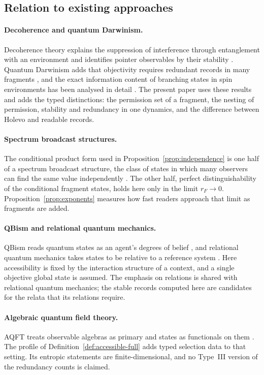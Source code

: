 \documentclass[12pt,a4paper]{article}
\begin{document}
\subsection{Relation to existing approaches}
\label{sec:relations}

\paragraph{Decoherence and quantum Darwinism.} Decoherence theory explains the suppression of interference through entanglement with an environment and identifies pointer observables by their stability \cite{Zurek2003}. Quantum Darwinism adds that objectivity requires redundant records in many fragments \cite{Zurek2009}, and the exact information content of branching states in spin environments has been analysed in detail \cite{ZwolakRiedelZurek2016}. The present paper uses these results and adds the typed distinctions: the permission set of a fragment, the nesting of permission, stability and redundancy in one dynamics, and the difference between Holevo and readable records.

\paragraph{Spectrum broadcast structures.} The conditional product form used in Proposition~\ref{prop:independence} is one half of a spectrum broadcast structure, the class of states in which many observers can find the same value independently \cite{HorodeckiKorbiczHorodecki2015}. The other half, perfect distinguishability of the conditional fragment states, holds here only in the limit $r_F\to0$. Proposition~\ref{prop:exponents} measures how fast readers approach that limit as fragments are added.

\paragraph{QBism and relational quantum mechanics.} QBism reads quantum states as an agent's degrees of belief \cite{Fuchs2014}, and relational quantum mechanics takes states to be relative to a reference system \cite{Rovelli1996}. Here accessibility is fixed by the interaction structure of a context, and a single objective global state is assumed. The emphasis on relations is shared with relational quantum mechanics; the stable records computed here are candidates for the relata that its relations require.

\paragraph{Algebraic quantum field theory.} AQFT treats observable algebras as primary and states as functionals on them \cite{Haag1996}. The profile of Definition~\ref{def:accessible-full} adds typed selection data to that setting. Its entropic statements are finite-dimensional, and no Type~III version of the redundancy counts is claimed.
\end{document}
